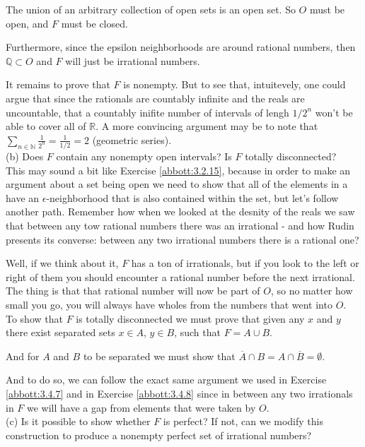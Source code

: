 The union of an arbitrary collection of open sets is an open set.
So $O$ must be open, and $F$ must be closed.

Furthermore, since the epsilon neighborhoods are around rational numbers,
then $\mathbb{Q} \subset O$ and $F$ will just be irrational numbers.

It remains to prove that $F$ is nonempty. But to see that, intuitevely, one could argue that
since the rationals are countably infinite and the reals are uncountable, that a countably inifite
number of intervals of lengh $1/2^n$ won't be able to cover all of $\mathbb{R}$.
A more convincing argument may be to note that
$\sum_{n\in\mathbb{N}} \frac{1}{2^n} = \frac{1}{1/2} = 2$ (geometric series).
\\

(b) Does $F$ contain any nonempty open intervals?
Is $F$ totally disconnected?
\\

This may sound a bit like Exercise \ref{abbott:3.2.15}, because in order to make an argument about
a set being open we need to show that all of the elements in a have an $\epsilon$-neighborhood
that is also contained within the set, but let's follow another path.
Remember how when we looked at the desnity of the reals we saw that between any tow rational numbers
there was an irrational - and how Rudin presents its converse: between any two irrational numbers there
is a rational one?

Well, if we think about it, $F$ has a ton of irrationals, but if you look to the left or right of them
you should encounter a rational number before the next irrational.
The thing is that that rational number will now be part of $O$, so no matter how small you go,
you will always have wholes from the numbers that went into $O$.
\\

To show that $F$ is totally disconnected we must prove that given any $x$ and $y$
there exist separated sets $x \in A$, $y \in B$, such that $F = A \cup B$.

And for $A$ and $B$ to be separated we must show that
$\overline{A} \cap B = A \cap \overline{B} = \emptyset$.

And to do so, we can follow the exact same argument we used in Exercise \ref{abbott:3.4.7}
and in Exercise \ref{abbott:3.4.8} since in between any two irrationals in $F$ we will have a gap
from elements that were taken by $O$.
\\

(c) Is it possible to show whether $F$ is perfect?
If not, can we modify this construction to produce a nonempty perfect set of irrational numbers?
\\